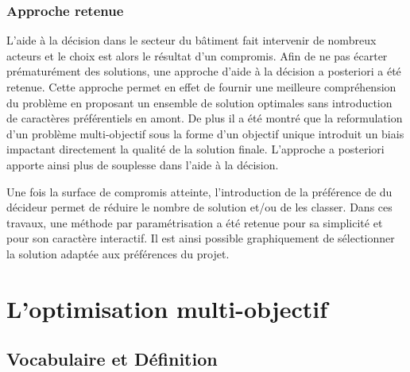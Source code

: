 \subsubsection{Approche retenue} %
\label{ssub:approche_retenue}
L’aide à la décision dans le secteur du bâtiment fait intervenir de nombreux acteurs
et le choix est alors le résultat d’un compromis. Afin de ne pas écarter prématurément
des solutions, une approche d’aide à la décision a posteriori a été retenue. Cette approche
permet en effet de fournir une meilleure compréhension du problème en proposant un
ensemble de solution optimales sans introduction de caractères préférentiels en amont.
De plus il a été montré que la reformulation d’un problème multi-objectif sous la
forme d’un objectif unique introduit un biais impactant directement la qualité de
la solution finale. L’approche a posteriori apporte ainsi plus de souplesse dans
l’aide à la décision.

Une fois la surface de compromis atteinte, l’introduction de la préférence de
du décideur permet de réduire le nombre de solution et/ou de les classer.
Dans ces travaux, une méthode par paramétrisation a été retenue pour sa simplicité
et pour son caractère interactif. Il est ainsi possible graphiquement de sélectionner
la solution adaptée aux préférences du projet.




\section{L’optimisation multi-objectif} %
\label{sec:l_optimisation_multi_objectif}
\subsection{Vocabulaire et Définition} %
\label{sub:vocabulaire_et_definition}


